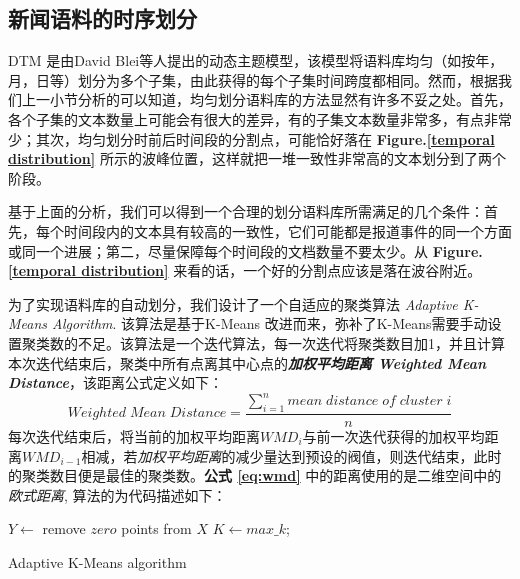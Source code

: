 \subsection{新闻语料的时序划分}
DTM \cite{Blei:2006}是由David Blei等人提出的动态主题模型，该模型将语料库均匀（如按年，月，日等）划分为多个子集，由此获得的每个子集时间跨度都相同。然而，根据我们上一小节分析的可以知道，均匀划分语料库的方法显然有许多不妥之处。首先，各个子集的文本数量上可能会有很大的差异，有的子集文本数量非常多，有点非常少；其次，均匀划分时前后时间段的分割点，可能恰好落在 \textbf{Figure.\ref{temporal distribution}} 所示的波峰位置，这样就把一堆一致性非常高的文本划分到了两个阶段。

基于上面的分析，我们可以得到一个合理的划分语料库所需满足的几个条件：首先，每个时间段内的文本具有较高的一致性，它们可能都是报道事件的同一个方面或同一个进展；第二，尽量保障每个时间段的文档数量不要太少。从 \textbf{Figure.\ref{temporal distribution}} 来看的话，一个好的分割点应该是落在波谷附近。

为了实现语料库的自动划分，我们设计了一个自适应的聚类算法 \emph{Adaptive K-Means Algorithm}. 该算法是基于K-Means \cite{kanungo2002efficient} 改进而来，弥补了K-Means需要手动设置聚类数的不足。该算法是一个迭代算法，每一次迭代将聚类数目加1，并且计算本次迭代结束后，聚类中所有点离其中心点的\textbf{\emph{加权平均距离 Weighted Mean Distance}}，该距离公式定义如下：
\begin{equation}\label{eq:wmd}
Weighted\;Mean\;Distance=\frac{\sum_{i=1}^{n}{mean\;distance\;of\;cluster\;i}}{n}
\end{equation}
每次迭代结束后，将当前的加权平均距离$WMD_i$与前一次迭代获得的加权平均距离$WMD_{i-1}$相减，若\emph{加权平均距离}的减少量达到预设的阀值，则迭代结束，此时的聚类数目便是最佳的聚类数。\textbf{公式 \ref{eq:wmd}} 中的距离使用的是二维空间中的\emph{欧式距离}, 算法的为代码描述如下：

\begin{algorithm}
  \DontPrintSemicolon
  \BlankLine
  $Y \longleftarrow$ remove $zero$ points from $X$\;
   {$K \leftarrow max\_k$;\;}
  \caption{Adaptive K-Means algorithm}
  \label{algorithm1}
\end{algorithm}

